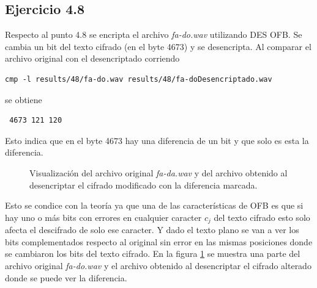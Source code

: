 \documentclass[a4paper,10pt]{article}
\begin{document}
\subsection{Ejercicio 4.8}
Respecto al punto 4.8 se encripta el archivo \emph{fa-do.wav} utilizando DES OFB.
Se cambia un bit del texto cifrado (en el byte 4673) y se desencripta. Al comparar
el archivo original con el desencriptado corriendo
\begin{lstlisting}
cmp -l results/48/fa-do.wav results/48/fa-doDesencriptado.wav 
\end{lstlisting}
se obtiene 
\begin{lstlisting}
 4673 121 120
\end{lstlisting}
Esto indica que en el byte 4673 hay una diferencia de un bit y que solo es esta la diferencia.
\begin{figure}
	\begin{center}
	\end{center}
	\caption{Visualización del archivo original \emph{fa-da.wav} y del archivo obtenido 
		al desencriptar el cifrado modificado con la diferencia marcada.}
	\label{fig:48}
\end{figure}
Esto se condice con la teor\'ia ya que una de las caracter\'isticas de OFB es que si
hay uno o m\'as bits con errores en cualquier caracter $ c_{j} $ del texto cifrado
esto solo afecta el descifrado de solo ese caracter. Y dado el texto plano se van a ver
los bits complementados respecto al original sin error en las mismas posiciones donde 
se cambiaron los bits del texto cifrado. En la figura \ref{fig:48} se muestra una 
parte del archivo original \emph{fa-do.wav} y el archivo obtenido al desencriptar
el cifrado alterado donde se puede ver la diferencia.
\end{document}
